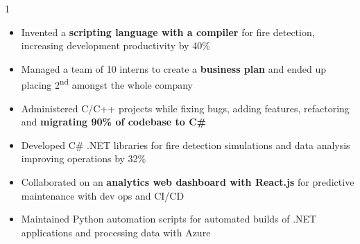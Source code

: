 \documentclass[11pt,a4paper,ragged2e]{altacv}
\begin{document}
\begin{paracol}{1}

\begin{itemize}
\item Invented a \textbf{scripting language with a compiler} for fire detection, increasing development productivity by 40\%
\item Managed a team of 10 interns to create a \textbf{business plan} and ended up placing 2\textsuperscript{nd} amongst the whole company
\item Administered C/C++ projects while fixing bugs, adding features, refactoring and \textbf{migrating 90\% of codebase to C\#}
\item Developed C\# .NET libraries for fire detection simulations and data analysis improving operations by 32\%
\item Collaborated on an \textbf{analytics web dashboard with React.js} for predictive maintenance with dev ops and CI/CD
\item Maintained Python automation scripts for automated builds of .NET applications and processing data with Azure
\end{itemize}
\tightdivider


\end{paracol}
\end{document}
